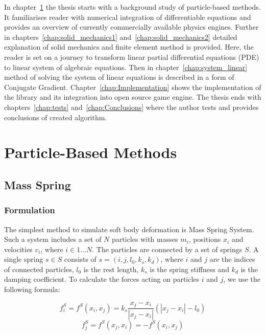 \documentclass[en]{minipw} %
\begin{document}
In chapter~\ref{chap:background} the thesis starts with a background study of particle-based methods. It familiarises reader with numerical integration of differentiable equations and provides an overview of currently commercially available physics engines.
Further in chapters~\ref{chap:solid_mechanics1} and~\ref{chap:solid_mechanics2} detailed explanation of solid mechanics and finite element method is provided. Here, the reader is set on a journey to transform linear partial differential equations (PDE) to linear system of algebraic equations. Then in chapter~\ref{chap:system_linear} method of solving the system of linear equations is described in a form of  Conjugate Gradient.
Chapter~\ref{chap:Implementation} shows the implementation of the library and its integration into open source game engine.
The thesis ends with chapters~\ref{chap:tests} and~\ref{chap:Conclusions} where the author tests and provides conclusions of created algorithm.

\chapter{Particle-Based Methods}
\label{chap:background}

\section{Mass Spring}
\subsection{Formulation}
The simplest method to simulate soft body deformation is Mass Spring System.
Such a system includes a set of $N$ particles with masses $m_i$, positions $x_i$ and velocities $v_i$, where $i \in 1...N$. The particles are connected by a set of springs $S$. A single spring $s \in S$ consists of $s = (i, j, l_0, k_s, k_d)$, where $i$ and $j$ are the indices of connected particles, $l_0$ is the rest length, $k_s$ is the spring stiffness and $k_d$ is the damping coefficient. To calculate the forces acting on particles $i$ and $j$, we use the following formula:

\begin{equation}
f_{i}^{S} = f^{S}(x_i, x_j) = k_s \dfrac{x_j - x_i}{|x_j - x_i|}(|x_j - x_i| - l_0)
\end{equation}
\begin{equation}
f_{j}^{S} = f^{S}(x_j, x_i) = -f^{S}(x_i, x_j)
\end{equation}
\end{document}
